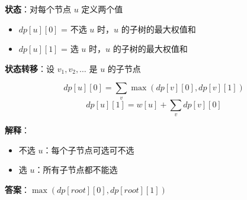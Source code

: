 \documentclass[12pt, a4paper]{ctexart}
\begin{document}
\begin{blackboard}[树形 DP 状态定义]

\textbf{状态}：对每个节点 $u$ 定义两个值
\begin{itemize}
    \item $dp[u][0]$ = 不选 $u$ 时，$u$ 的子树的最大权值和
    \item $dp[u][1]$ = 选 $u$ 时，$u$ 的子树的最大权值和
\end{itemize}

\textbf{状态转移}：设 $v_1, v_2, \ldots$ 是 $u$ 的子节点

\[
dp[u][0] = \sum_v \max(dp[v][0], dp[v][1])
\]
\[
dp[u][1] = w[u] + \sum_v dp[v][0]
\]

\textbf{解释}：
\begin{itemize}
    \item 不选 $u$：每个子节点可选可不选
    \item 选 $u$：所有子节点都不能选
\end{itemize}

\textbf{答案}：$\max(dp[root][0], dp[root][1])$

\end{blackboard}
\end{document}

